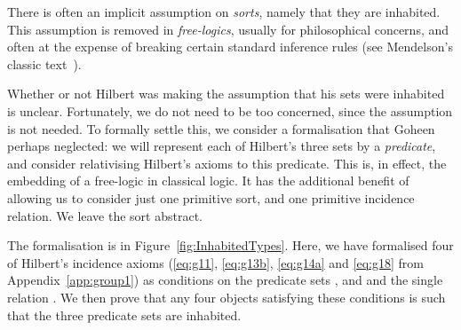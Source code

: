 There is often an implicit assumption on \emph{sorts}, namely that they are inhabited. This assumption is removed in \emph{free-logics}, usually for philosophical concerns, and often at the expense of breaking certain standard inference rules (see Mendelson's classic text~\cite{Mendelson}). 

Whether or not Hilbert was making the assumption that his sets were inhabited is unclear. Fortunately, we do not need to be too concerned, since the assumption is not needed. To formally settle this, we consider a formalisation that Goheen perhaps neglected: we will represent each of Hilbert's three sets by a \emph{predicate}, and consider relativising Hilbert's axioms to this predicate. This is, in effect, the embedding of a free-logic in classical logic. It has the additional benefit of allowing us to consider just one primitive sort, and one primitive incidence relation. We leave the sort abstract.

The formalisation is in Figure~\ref{fig:InhabitedTypes}. Here, we have formalised four of Hilbert's incidence axioms (\ref{eq:g11}, \ref{eq:g13b}, \ref{eq:g14a} and \ref{eq:g18} from Appendix~\ref{app:group1}) as conditions on the predicate sets ,  and  and the single relation . We then prove that any four objects satisfying these conditions is such that the three predicate sets are inhabited.

